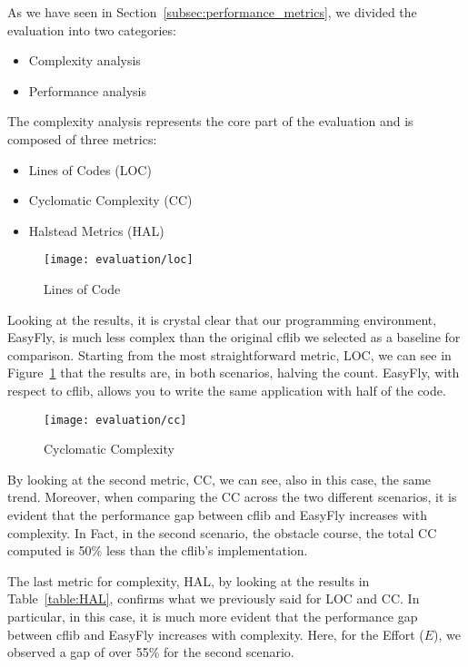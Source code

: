 As we have seen in Section~\ref{subsec:performance_metrics}, we divided the evaluation into two categories:
\begin{itemize}
    \item Complexity analysis
    \item Performance analysis
\end{itemize}

The complexity analysis represents the core part of the evaluation and is composed of three metrics:
\begin{itemize}
    \item Lines of Codes (LOC)
    \item Cyclomatic Complexity (CC)
    \item Halstead Metrics (HAL)
\end{itemize}

\begin{figure}[t]
    \centering
    \texttt{[image: evaluation/loc]}
    \caption{Lines of Code}\label{fig:loc_count}
\end{figure}

Looking at the results, it is crystal clear that our programming environment, EasyFly, is much less complex than the original cflib we selected as a baseline for comparison.
Starting from the most straightforward metric, LOC, we can see in Figure~\ref{fig:loc_count} that the results are, in both scenarios, halving the count.
EasyFly, with respect to cflib, allows you to write the same application with half of the code.

\begin{figure}[t]
    \centering
    \texttt{[image: evaluation/cc]}
    \caption{Cyclomatic Complexity}\label{fig:cc}
\end{figure}

By looking at the second metric, CC, we can see, also in this case, the same trend.
Moreover, when comparing the CC across the two different scenarios, it is evident that the performance gap between cflib and EasyFly increases with complexity.
In Fact, in the second scenario, the obstacle course, the total CC computed is 50\% less than the cflib's implementation.

The last metric for complexity, HAL, by looking at the results in Table~\ref{table:HAL}, confirms what we previously said for LOC and CC. 
In particular, in this case, it is much more evident that the performance gap between cflib and EasyFly increases with complexity.
Here, for the Effort (\( E \)), we observed a gap of over 55\% for the second scenario.

